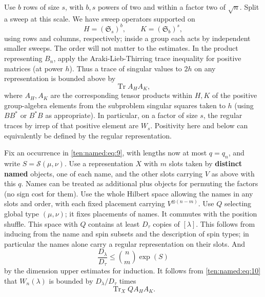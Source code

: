 Use \(b\) rows of size \(s\), with \(b,s\) powers of two and within a factor two of \(\sqrt n\). Split a sweep at this scale. We have sweep operators supported on
\[
 H=(\mathfrak S_s)^b,\qquad K=(\mathfrak S_b)^s,
\]
using rows and columns, respectively; inside a group each acts by independent smaller sweeps. The order will not matter to the estimates. In the product representing \(B_n\), apply the Araki-Lieb-Thirring trace inequality for positive matrices (at power \(h\)). Thus a trace of singular values to \(2h\) on any representation is bounded above by
\begin{equation}
 \operatorname{Tr} A_H A_K,
 \label{ten:named:eq:10}
\end{equation}
where \(A_H,A_K\) are the corresponding tensor products within \(H,K\) of the positive group-algebra elements from the subproblem singular squares taken to \(h\) (using \(BB^*\) or \(B^*B\) as appropriate). In particular, on a factor of size \(s\), the regular traces by irrep of that positive element are \(W_s\). Positivity here and below can equivalently be defined by the regular representation.

Fix an occurrence in \eqref{ten:named:eq:9}, with lengths now at most \(q=q_n\), and write \(S=\mathcal S(\mu,\nu)\). Use a representation \(X\) with \(m\) slots taken by \textbf{distinct named} objects, one of each name, and the other slots carrying \(V\) as above with this \(q\). Names can be treated as additional plus objects for permuting the factors (no sign cost for them). Use the whole Hilbert space allowing the names in any slots and order, with each fixed placement carrying \(V^{\otimes(n-m)}\). Use \(Q\) selecting global type \((\mu,\nu)\); it fixes placements of names. It commutes with the position shuffle. This space with \(Q\) contains at least \(D_\tau\) copies of \([\lambda]\). This follows from inducing from the name and spin subsets and the description of spin types; in particular the names alone carry a regular representation on their slots. And
\begin{equation}
 \frac{D_\lambda}{D_\tau}
 \le \binom{n}{m}\exp(S)
 \label{ten:named:eq:11}
\end{equation}
by the dimension upper estimates for induction. It follows from \eqref{ten:named:eq:10} that \(W_n(\lambda)\) is bounded by \(D_\lambda/D_\tau\) times
\[
 \operatorname{Tr}_X Q A_H A_K .
\]

